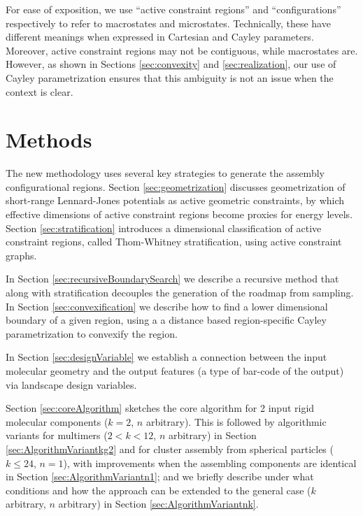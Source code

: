 \documentclass[]{article}
\begin{document}
\vspace{0.5cm}

 For ease of exposition, we use 
``active constraint regions'' and ``configurations'' respectively to refer to
macrostates and microstates. Technically, these have different meanings when
expressed in Cartesian and Cayley parameters. Moreover, active constraint
regions may not be contiguous, while macrostates are. However, as shown in Sections
\ref{sec:convexity} and \ref{sec:realization}, our use of Cayley
parametrization ensures that this ambiguity is not an issue when the context
is clear.

 \section{Methods}
\label{sec:methods}
The new methodology uses several key strategies to generate the assembly
configurational regions. Section \ref{sec:geometrization} discusses
geometrization of short-range Lennard-Jones potentials as active geometric
constraints, by which effective dimensions of active constraint regions become
proxies for energy levels. Section \ref{sec:stratification} introduces a
dimensional classification of active constraint regions, called Thom-Whitney
stratification, using active constraint graphs.

In Section \ref{sec:recursiveBoundarySearch} we describe a recursive method
that along with stratification decouples the generation of the roadmap from
sampling.  In Section \ref{sec:convexification} we describe how to find  a
lower dimensional boundary of a given region, using a a distance based
region-specific Cayley parametrization to convexify the region.

In Section \ref{sec:designVariable} we establish a connection between the input
molecular geometry and the output features (a type of bar-code of the output)
via landscape design variables.

Section \ref{sec:coreAlgorithm} sketches the core algorithm for 2 input rigid
molecular components ($k =2$, $n$ arbitrary). This is followed by algorithmic
variants for multimers ($2 < k < 12$, $n$ arbitrary) in Section
\ref{sec:AlgorithmVariantkg2} and for cluster assembly from spherical particles
($k \le 24$, $n=1$), with improvements when the assembling components are
identical in Section \ref{sec:AlgorithmVariantn1}; and we briefly describe
under what conditions and how the approach can be extended to the general case
($k$ arbitrary, $n$ arbitrary) in Section \ref{sec:AlgorithmVariantnk}.
\end{document}
